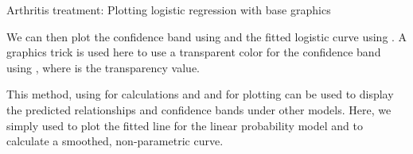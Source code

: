 \documentclass[11pt]{book}
\renewenvironment{knitrout}{\small\renewcommand{\baselinestretch}{.85}}{} %
\begin{document}
\begin{Example}[arthrit7]{Arthritis treatment: Plotting logistic regression with base graphics}
\begin{knitrout}
\begin{kframe}
\begin{alltt}
 \hlkwb{<-} \hlopt{$} \hlopt{+}  \hlopt{*} \hlopt{$}
 \hlkwb{<-} \hlopt{$} \hlopt{-}  \hlopt{*} \hlopt{$}
\end{alltt}
\end{kframe}
\end{knitrout}
We can then plot the confidence band using  and the fitted logistic curve
using .  A graphics trick is used here to use a transparent color for
the confidence band using , where  is the
transparency value.
\begin{knitrout}
\color{fgcolor}\begin{kframe}
\begin{alltt}
\hlstd{(} 
         
        \hlstd{=}\hlstd{(}\hlstd{,} \hlstd{,} \hlstd{,} \hlstd{),} \hlstd{=}\hlstd{)}
\hlopt{$} \hlstd{=} \hlstd{,} \hlstd{=}\hlstd{)}
\end{alltt}
\end{kframe}
\end{knitrout}
This method, using  for calculations and  and 
for plotting can be used to display the predicted relationships and confidence bands
under other models.  Here, we simply used  to plot the fitted line
for the linear probability model  and  to calculate
a smoothed, non-parametric curve.

\begin{knitrout}
\color{fgcolor}\begin{kframe}
\begin{alltt}
 \hlstd{=}\hlstd{)}
\hlstd{(}\hlopt{$}\hlopt{$} \hlstd{=}\hlstd{),} \hlstd{=}\hlstd{,} \hlstd{=}\hlstd{)}
\end{alltt}
\end{kframe}
\end{knitrout}
\end{Example}
\end{document}
